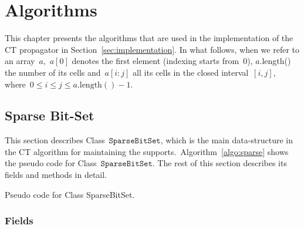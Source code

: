 \documentclass[a4paper,11pt]{article}
\newcommand{\Todo}[1]{{\color{blue}#1}}
\newcommand{\Chapref}[1]{Section~\ref{#1}}
\newcommand{\Algoref}[1]{Algorithm~\ref{#1}}
\newcommand{\Mask}{\texttt{mask}}
\newcommand{\SparseBitSet}{\texttt{SparseBitSet}}
\newcommand{\function}[1]{\mathrm{#1}}
\numberwithin{equation}{section}
\begin{document}

\section{Algorithms}
\label{sec:algorithms}


This chapter presents the algorithms that are used in the implementation of the
CT propagator in \Chapref{sec:implementation}. In what follows, when we refer to
an array~$a$,~$a[0]$ denotes the first element (indexing starts from~$0$),
$a$.length() the number of its cells and~$a[i:j]$ all its cells in the closed
interval~$[i,j]$, where~$0 \leq i \leq j \leq a.\function{length}() - 1$.

\subsection{Sparse Bit-Set}
\label{sec:sbs}
This section describes Class~$\SparseBitSet$, which is the main data-structure
in the CT algorithm for maintaining the supports.~\Algoref{algo:sparse} shows the
pseudo code for Class~$\SparseBitSet$. The rest of this section describes its
fields and methods in detail.

\begin{algorithm}[H]
  \begin{algorithmic}[1]  %
    
    \end{algorithmic}
  \caption{Pseudo code for Class SparseBitSet.}
  \label{algo:sparse}
\end{algorithm}

\subsubsection{Fields}
\label{sbs:fields}
\end{document}
